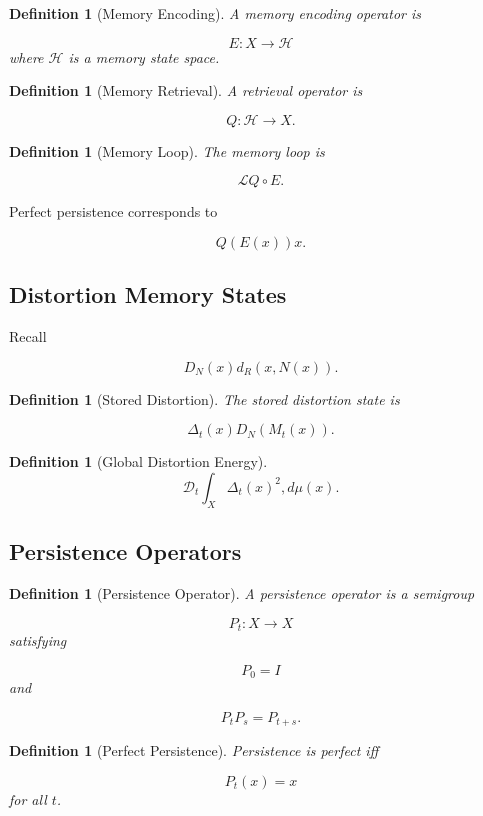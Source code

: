 \documentclass[12pt]{article}
\newtheorem{definition}[theorem]{Definition}
\theoremstyle{remark}
\begin{document}
\begin{definition}[Memory Encoding]
A memory encoding operator is

\[
E:X\rightarrow \mathcal H
\]
where \(\mathcal H\) is a memory state space.
\end{definition}

\begin{definition}[Memory Retrieval]
A retrieval operator is

\[
Q:\mathcal H\rightarrow X.
\]
\end{definition}
\begin{definition}[Memory Loop]
The memory loop is

\[
\mathcal L
Q\circ E.
\]
\end{definition}

Perfect persistence corresponds to

\[
Q(E(x))
x.
\]

\subsection{Distortion Memory States}

Recall

\[
D_N(x)
d_R(x,N(x)).
\]

\begin{definition}[Stored Distortion]
The stored distortion state is

\[
\Delta_t(x)
D_N(M_t(x)).
\]
\end{definition}

\begin{definition}[Global Distortion Energy]
\[
\mathcal D_t
\int_X
\Delta_t(x)^2
,d\mu(x).
\]
\end{definition}

\subsection{Persistence Operators}

\begin{definition}[Persistence Operator]
A persistence operator is a semigroup

\[
P_t:X\rightarrow X
\]
satisfying

\[
P_0=I
\]
and

\[
P_tP_s=P_{t+s}.
\]
\end{definition}
\begin{definition}[Perfect Persistence]
Persistence is perfect iff

\[
P_t(x)=x
\]
for all \(t\).
\end{definition}
\end{document}
